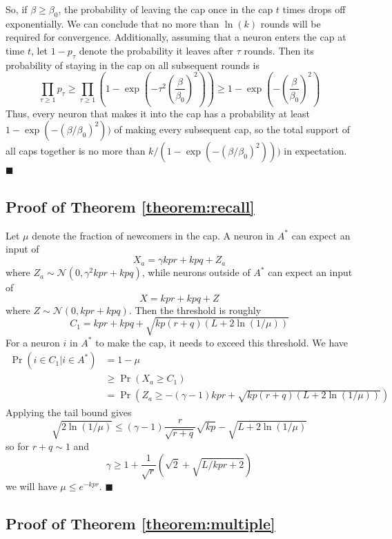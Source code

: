 \documentclass[final,12pt]{colt2022} %
\newcommand{\assmcore}[1]{{#1}^*}
\begin{document}
So, if $\beta \geq \beta_0$, the probability of leaving the cap once in the cap $t$ times drops off exponentially. We can conclude that no more than $\ln(k)$ rounds will be required for convergence. Additionally, assuming that a neuron enters the cap at time $t$, let $1 - p_\tau$ denote the probability it leaves after $\tau$ rounds. Then its probability of staying in the cap on all subsequent rounds is \[\prod_{\tau \geq 1} p_\tau \geq \prod_{\tau \geq 1}\left(1 - \exp\left(-\tau^2\left(\frac{\beta}{\beta_0}\right)^2\right)\right) \geq 1 - \exp\left(-\left(\frac{\beta}{\beta_0}\right)^2\right)\] Thus, every neuron that makes it into the cap has a probability at least $1 - \exp(-(\beta/\beta_0)^2))$ of making every subsequent cap, so the total support of all caps together is no more than $ k / (1 - \exp(-(\beta/\beta_0)^2)))$ in expectation.
\hfill$\blacksquare$

\subsection*{Proof of Theorem \ref{theorem:recall}} \label{appendix:recall}
Let $\mu$ denote the fraction of newcomers in the cap. A neuron in $\assmcore{A}$ can expect an input of \[X_a = \gamma kpr + kpq + Z_a\] where $Z_a \sim \mathcal N(0, \gamma^2kpr + kpq)$, while neurons outside of $\assmcore{A}$ can expect an input of \[X = kpr + kpq + Z\] where $Z \sim \mathcal N(0, kpr + kpq)$. Then the threshold is roughly \[C_1 = kpr + kpq + \sqrt{kp(r+q)(L + 2\ln(1/\mu))}\] For a neuron $i$ in $\assmcore{A}$ to make the cap, it needs to exceed this threshold. We have \begin{align*}
    \Pr (i \in C_1 | i \in \assmcore{A}) &= 1- \mu\\
    &\geq \Pr (X_a \geq C_1)\\
    &= \Pr \left(Z_a \geq -(\gamma-1) kpr + \sqrt{kp(r+q)(L + 2\ln(1/\mu))}\right)
\end{align*} Applying the tail bound gives \[\sqrt{2\ln(1/\mu)} \leq (\gamma - 1) \frac{r}{\sqrt{r+q}} \sqrt{kp} - \sqrt{L + 2\ln(1/\mu)} \] so for $r+q \sim 1$ and 
\[\gamma \geq 1 + \frac{1}{\sqrt{r}}\left(\sqrt{2} + \sqrt{L/kpr + 2}\right)\]
we will have $\mu \leq e^{-kpr}$.
\hfill$\blacksquare$

\subsection*{Proof of Theorem \ref{theorem:multiple}} \label{appendix:multiple}
\end{document}

